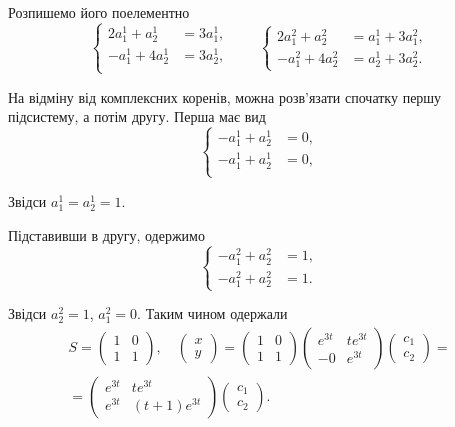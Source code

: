 \begin{solution}
    Розпишемо його поелементно
    \[ \left\{ \begin{aligned} 
        2 a_1^1 + a_2^1 &= 3 a_1^1, \\
        - a_1^1 + 4 a_2^1 &= 3 a_2^1, \\
    \end{aligned} \right. 
    \qquad
    \left\{ \begin{aligned} 
        2 a_1^2 + a_2^2 &= a_1^1 + 3 a_1^2, \\
        - a_1^2 + 4 a_2^2 &= a_2^1 + 3 a_2^2.
    \end{aligned} \right.\]
    
    На відміну від комплексних коренів, можна розв'язати спочатку першу підсистему, а потім другу. Перша має вид
    \[ \left\{ \begin{aligned} 
        - a_1^1 + a_2^1 &= 0, \\
        - a_1^1 + a_2^1 &= 0, \\
    \end{aligned} \right. \]
    
    Звідси $a_1^1 = a_2^1 = 1$. \parvskip
    
    Підставивши в другу, одержимо
    \[ \left\{ \begin{aligned} 
        - a_1^2 + a_2^2 &= 1, \\
        - a_1^2 + a_2^2 &= 1.
    \end{aligned} \right.\]
    
    Звідси $a_2^2 = 1$, $a_1^2 = 0$. Таким чином одержали
    \begin{multline*} S = \begin{pmatrix} 1 & 0 \\ 1 & 1 \end{pmatrix}, \quad \begin{pmatrix} x \\ y \end{pmatrix} = \begin{pmatrix} 1 & 0 \\ 1 & 1 \end{pmatrix} \begin{pmatrix} e^{3 t} & t e^{3 t} \\ -0 & e^{3 t} \end{pmatrix} \begin{pmatrix} c_1 \\ c_2 \end{pmatrix} = \\ = \begin{pmatrix} e^{3 t} & t e^{3 t} \\ e^{3 t} & (t + 1) e^{3 t} \end{pmatrix} \begin{pmatrix} c_1 \\ c_2 \end{pmatrix}. \end{multline*}
\end{solution}

